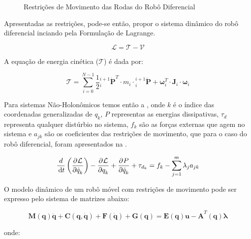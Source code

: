 \begin{figure}[!ht]
    \centering
    
    \caption{Restrições de Movimento das Rodas do Robô Diferencial}
    \label{fig:gocar}
\end{figure}

Apresentadas as restrições, pode-se então, propor o sistema dinâmico do robô diferencial inciando pela Formulação de Lagrange.

\begin{equation*}
    \mathcal{L}= \mathcal{T} - \mathcal{V}
\end{equation*}

A equação de energia cinética ($\mathcal{T}$) é dada por:

\begin{equation}
    \mathcal{T} = \sum\limits_{i=0}^{N-1} \frac{1}{2} {}_{i}^{i+1}\dot{\mathbf{P}}^T\cdot m_{i}\cdot {}_{i}^{i+1}\dot{\mathbf{P}}+ \mathbf{\omega}_i^T\cdot \mathbf{J}_i \cdot \mathbf{\omega}_i
\end{equation}

Para sistemas Não-Holonômicos temos então a , onde $k$ é o índice das coordenadas generalizadas de $q_k$, $P$ representas as energias dissipativas, $\tau_d$ representa qualquer distúrbio no sistema, $f_k$ são as forças externas que agem no sistema e $a_{jk}$ são os coeficientes das restrições de movimento, que para o caso do robô diferencial, foram apresentados na .

\begin{equation}
    \frac{d}{\df{t}}\left( \parcial{}{\mathcal{L}}{\dot{q}_k}\right)
    -\parcial{}{\mathcal{L}}{q_k} 
    + \parcial{}{P}{\dot{q}_k}
    +\tau_{d_k}
    = f_k - \sum\limits^{m}_{j=1}\lambda_j a_{jk}
    \label{eq:lagrangenonhomo}
\end{equation}

O modelo dinâmico de um robô móvel com restrições de movimento pode ser expresso pelo sistema de matrizes abaixo:

\begin{equation}
    \mathbf{M(q)\ddot{q}+ C(q, \dot{q})+ F(\dot{q})+G(q) = E(q)u -A}^T\mathbf{(q)}\boldsymbol{\lambda}
\end{equation}

\noindent onde:

